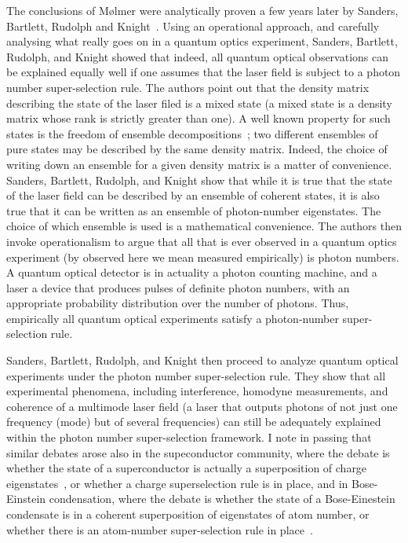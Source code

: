 \documentclass{article}
\begin{document}
The conclusions of M{\o}lmer were analytically proven a few years later by Sanders, Bartlett, Rudolph and Knight~\cite{SBRK03}.  Using an operational approach, and carefully analysing what really goes on in a quantum optics experiment, Sanders, Bartlett, Rudolph, and Knight showed that indeed, all quantum optical observations can be explained equally well if one assumes that the laser field is subject to a photon number super-selection rule. The authors point out that the density matrix describing the state of the laser filed is a mixed state (a mixed state is a density matrix whose rank is strictly greater than one). A well known property for such states is the freedom of ensemble decompositions~\cite{NC00}; two different ensembles of pure states may be described by the same density matrix.  Indeed, the choice of writing down an ensemble for a given density matrix is a matter of convenience.  Sanders, Bartlett, Rudolph, and Knight show that while it is true that the state of the laser field can be described by an ensemble of coherent states, it is also true that it can be written as an ensemble of photon-number eigenstates.  The choice of which ensemble is used is a mathematical convenience. The authors then invoke operationalism to argue that all that is ever observed in a quantum optics experiment (by observed here we mean measured empirically) is photon numbers.  A quantum optical detector is in actuality a photon counting machine, and a laser a device that produces pulses of definite photon numbers, with an appropriate probability distribution over the number of photons.  Thus, empirically all quantum optical experiments satisfy a photon-number super-selection rule. 

Sanders, Bartlett, Rudolph, and Knight then proceed to analyze quantum optical experiments under the photon number super-selection rule.  They show that all experimental phenomena, including interference, homodyne measurements, and coherence of a multimode laser field (a laser that outputs photons of not just one frequency (mode) but of several frequencies) can still be adequately explained within the photon number super-selection framework.   I note in passing that similar debates arose also in the supeconductor community, where the debate is whether the state of a superconductor is actually a superposition of charge eigenstates~\cite{H62,KW74,A86}, or whether a charge superselection rule is in place, and in Bose-Einstein condensation, where the debate is whether the state of a Bose-Einestein condensate is in a coherent superposition of eigenstates of atom number, or whether there is an atom-number super-selection rule in place~\cite{JY96,HY96,YRJ97,CD97}.
\end{document}
